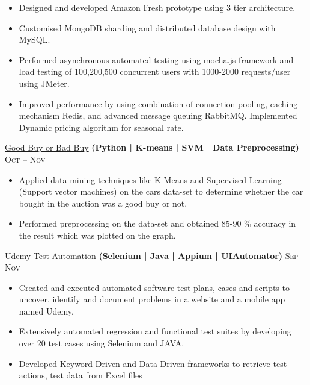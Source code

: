 \documentclass[10pt,a4paper]{article}
\begin{document}
{{{    {\bodytext
    {
    \begin{itemize}
        \item Designed and developed Amazon Fresh prototype using 3 tier architecture.
        \item Customised MongoDB sharding and distributed database design with MySQL.
        \item Performed asynchronous automated testing using mocha.js framework and load testing of 100,200,500 concurrent users with 1000-2000 requests/user using JMeter.
        \item Improved performance by using combination of connection pooling, caching mechanism Redis, and advanced message queuing RabbitMQ. Implemented Dynamic pricing algorithm for seasonal rate.
    \end{itemize}}}
}

\headedsection  %
  {\href{https://github.com/vansh007/TEAM-MINER}{Good Buy or Bad Buy}
  \textbf{
  \small{(Python | K-means | SVM | Data Preprocessing)}}}
  {\textsc{Oct  -- Nov }} {%
  
    {\bodytext
    {
    \begin{itemize}
        \item Applied data mining techniques like K-Means and Supervised Learning (Support vector machines) on the cars data-set to determine whether the car bought in the auction was a good buy or not.
        \item Performed preprocessing on the data-set and obtained 85-90 \% accuracy in the result which was plotted on the graph.
        
    \end{itemize}}}
}

\headedsection  %
  {\href{https://github.com/vansh007}{Udemy Test Automation}
  \textbf{
  \small{(Selenium | Java | Appium | UIAutomator)}}}
  {\textsc{Sep  -- Nov }} {%
  
    {\bodytext
    {
    \begin{itemize}
        \item Created and executed automated software test plans, cases and scripts to uncover, identify and document problems in a website and a mobile app named Udemy.
        \item Extensively automated regression and functional test suites by developing over 20 test cases using Selenium and JAVA.
        \item Developed Keyword Driven and Data Driven frameworks to retrieve test actions, test data from Excel files
        

\end{itemize}}}}}}
\end{document}
